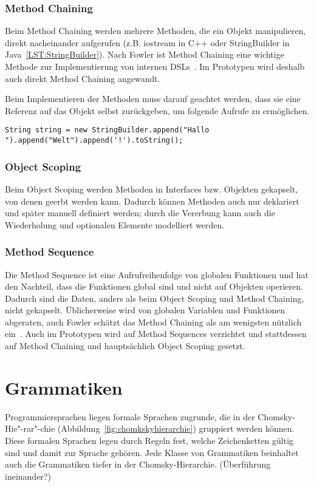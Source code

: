 \documentclass[../InterneDSLs.tex]{subfiles}
\begin{document}
\subsection{Method Chaining}
Beim Method Chaining werden mehrere Methoden, die ein Objekt manipulieren, direkt nacheinander aufgerufen (z.B. iostream in C++ oder StringBuilder in Java~\ref{LST:StringBuilder}). Nach Fowler ist Method Chaining eine wichtige Methode zur Implementierung von internen DSLs~\cite[S.~373]{Fowler.2010}. Im Prototypen wird deshalb auch direkt Method Chaining angewandt.

Beim Implementieren der Methoden muss darauf geachtet werden, dass sie eine Referenz auf das Objekt selbst zurückgeben, um folgende Aufrufe zu ermöglichen.

\begin{lstlisting}[label=LST:StringBuilder,caption={Method Chaining beim StringBuilder}]
String string = new StringBuilder.append("Hallo ").append("Welt").append('!').toString();
\end{lstlisting}

\subsection{Object Scoping}
Beim Object Scoping werden Methoden in Interfaces bzw. Objekten gekapselt, von denen geerbt werden kann. Dadurch können Methoden auch nur deklariert und später manuell definiert werden; durch die Vererbung kann auch die Wiederholung und optionalen Elemente modelliert werden.

\subsection{Method Sequence}
Die Method Sequence ist eine Aufrufreihenfolge von globalen Funktionen und hat den Nachteil, dass die Funktionen global sind und nicht auf Objekten operieren. Dadurch sind die Daten, anders als beim Object Scoping und Method Chaining, nicht gekapselt. Üblicherweise wird von globalen Variablen und Funktionen abgeraten, auch Fowler schätzt das Method Chaining als am wenigsten nützlich ein~\cite[S. 352]{Fowler.2010}. Auch im Prototypen wird auf Method Sequences verzichtet und stattdessen auf Method Chaining und hauptsächlich Object Scoping gesetzt.

\chapter{Grammatiken}\label{SEC:Grammars}
Programmiersprachen liegen formale Sprachen zugrunde, die in der Chomsky-Hie"-rar"-chie (Abbildung~\ref{fig:chomkskyhierarchie}) gruppiert werden können. Diese formalen Sprachen legen durch Regeln fest, welche Zeichenketten gültig sind und damit zur Sprache gehören. Jede Klasse von Grammatiken beinhaltet auch die Grammatiken tiefer in der Chomsky-Hierarchie. (Überführung ineinander?)
\end{document}
